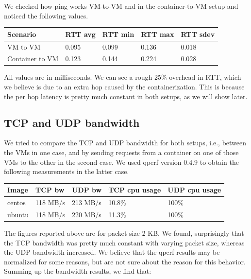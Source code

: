 \documentclass[letterpaper, 10 pt, conference]{ieeeconf}  %
\begin{document}
We checked how ping works VM-to-VM and in the container-to-VM setup and noticed the following values.

\vspace{5pt}

\begin{tabular}{|p{75pt}|p{25pt}|p{25pt}|p{25pt}|p{25pt}|}
\hline
Scenario & RTT avg	& RTT min & RTT max	& RTT sdev \\
\hline
VM to VM &	0.095  & 0.099 & 0.136 & 0.018  \\
\hline
Container to VM	& 0.123 & 0.144 & 0.224 & 0.028 \\
\hline
\end{tabular}

\vspace{5pt}

All values are in milliseconds. We can see a rough 25\% overhead in RTT, which we believe is due to an extra hop caused by the containerization. This is because the per hop latency is pretty much constant in both setups, as we will show later.

\subsection{TCP and UDP bandwidth}

We tried to compare the TCP and UDP bandwidth for both setups, i.e., between the VMs in one case, and by sending requests from a container on one of those VMs to the other in the second case. We used qperf \cite{qperf} version 0.4.9 to obtain the following measurements in the latter case.

\vspace{5pt}

\begin{tabular}{|p{25pt}|p{30pt}|p{30pt}|p{40pt}|p{40pt}|}
\hline
Image & TCP bw & UDP bw & TCP cpu usage & UDP cpu usage \\
\hline
centos & 118 MB/s & 213 MB/s & 10.8\% & 100\% \\
\hline
ubuntu & 118 MB/s & 220 MB/s & 11.3\% & 100\% \\
\hline
\end{tabular}

\vspace{10pt}

The figures reported above are for packet size 2 KB. We found, surprisingly that the TCP bandwidth was pretty much constant with varying packet size, whereas the UDP bandwidth increased. We believe that the qperf results may be normalized for some reasons, but are not sure about the reason for this behavior. Summing up the bandwidth results, we find that:
\end{document}
